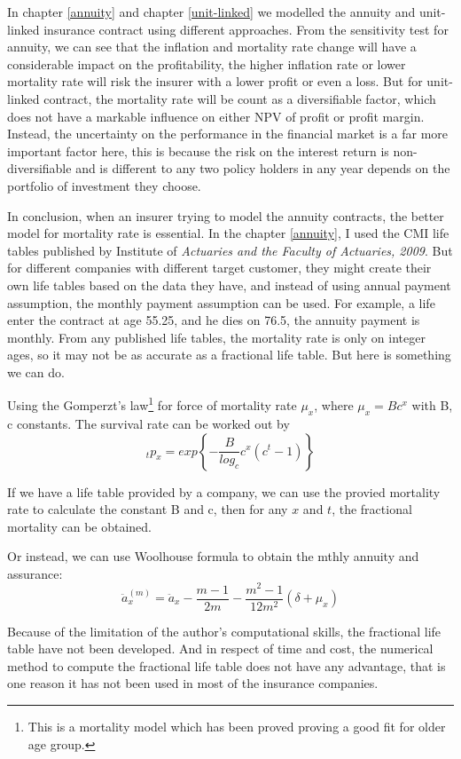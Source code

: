 \documentclass{report}
\begin{document}
In chapter \ref{annuity} and chapter \ref{unit-linked} we modelled the annuity and unit-linked insurance contract using different approaches. From the sensitivity test for annuity, we can see that the inflation and mortality rate change will have a considerable impact on the profitability, the higher inflation rate or lower mortality rate will risk the insurer with a lower profit or even a loss. But for unit-linked contract, the mortality rate will be count as a diversifiable factor, which does not have a markable influence on either NPV of profit or profit margin. Instead, the uncertainty on the performance in the financial market is a far more important factor here, this is because the risk on the interest return is non-diversifiable and is different to any two policy holders in any year depends on the portfolio of investment they choose.


In conclusion, when an insurer trying to model the annuity contracts, the better model for mortality rate is essential. In the chapter \ref{annuity}, I used the CMI life tables published by Institute of {\em Actuaries and the Faculty of Actuaries, 2009}. But for different companies with different target customer, they might create their own life tables based on the data they have, and instead of using annual payment assumption, the monthly payment assumption can be used. For example, a life enter the contract at age 55.25, and he dies on 76.5, the annuity payment is monthly. From any published life tables, the mortality rate is only on integer ages, so it may not be as accurate as a fractional life table. But here is something we can do.

Using the Gomperzt's law\footnote{ This is a mortality model which has been proved proving a good fit for older age group.} for force of mortality rate $\mu_x$, where $\mu_x=Bc^x$ with B, c constants. The survival rate can be worked out by
\[
_tp_x = exp \left\{ -\frac{B}{log_c} c^x (c^t-1) \right\}
\]

If we have a life table provided by a company, we can use the provied mortality rate to calculate the constant B and c, then for any $x$ and $t$, the fractional mortality can be obtained.

Or instead, we can use Woolhouse formula to obtain the mthly annuity and assurance:
\[
\ddot{a}_x^(m) = \ddot{a}_x  -\frac{m-1}{2m}-\frac{m^2-1}{12m^2}(	\delta +\mu_x)
\]

Because of the limitation of the author's computational skills, the fractional life table have not been developed. And in respect of time and cost, the numerical method to compute the fractional life table does not have any advantage, that is one reason it has not been used in most of the insurance companies. 
\end{document}
